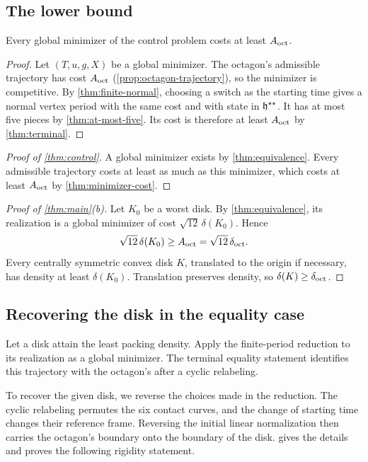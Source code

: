 \subsection{The lower bound}\label{sec:terminal-proofs}

\begin{theorem}\label{thm:minimizer-cost}
Every global minimizer of the control problem costs at least $A_{\mathrm{oct}}$.
\end{theorem}

\begin{proof}
Let $(T,u,g,X)$ be a global minimizer. The octagon's admissible trajectory has cost $A_{\mathrm{oct}}$
(\cref{prop:octagon-trajectory}), so the minimizer is competitive. By \cref{thm:finite-normal},
choosing a switch as the starting time gives a normal vertex period with the same cost and with
state in $\mathfrak{h}^{\star\star}$. It has at most five pieces by \cref{thm:at-most-five}. Its cost is
therefore at least $A_{\mathrm{oct}}$ by \cref{thm:terminal}.
\end{proof}

\begin{proof}[Proof of \cref{thm:control}]
A global minimizer exists by \cref{thm:equivalence}. Every admissible trajectory costs at least
as much as this minimizer, which costs at least $A_{\mathrm{oct}}$ by \cref{thm:minimizer-cost}.
\end{proof}

\begin{proof}[Proof of \cref{thm:main}\textup{(b)}]
Let $K_0$ be a worst disk. By \cref{thm:equivalence}, its realization is a global minimizer of
cost $\sqrt{12}\,\delta(K_0)$. Hence
\[
  \sqrt{12}\,\delta(K_0)\ge A_{\mathrm{oct}}=\sqrt{12}\,\delta_{\mathrm{oct}}.
\]
Every centrally symmetric convex disk $K$, translated to the origin if necessary, has density at
least $\delta(K_0)$. Translation preserves density, so $\delta(K)\ge\delta_{\mathrm{oct}}$.
\end{proof}

\subsection{Recovering the disk in the equality case}\label{sec:outline-equality}

Let a disk attain the least packing density. Apply the finite-period reduction to its realization
as a global minimizer. The terminal equality statement identifies this trajectory with the
octagon's after a cyclic relabeling.

To recover the given disk, we reverse the choices made in the reduction. The cyclic relabeling
permutes the six contact curves, and the change of starting time changes their reference frame.
Reversing the initial linear normalization then carries the octagon's boundary onto the boundary
of the disk.  gives the details and proves the following rigidity
statement.

